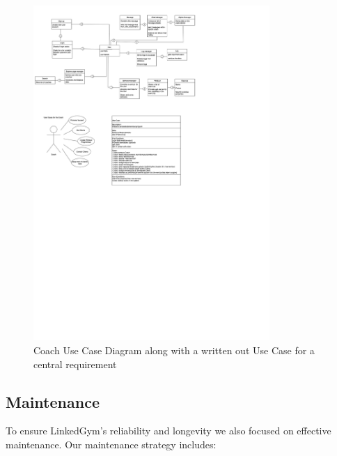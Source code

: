   \begin{figure}[H]
    \centering
    \includegraphics[width=0.8\textwidth]{images/usercase.png}
    \caption{ Coach Use Case Diagram along with a written out Use Case for a central requirement }
    \label{fig:usercase}
  \end{figure}




\subsection{Maintenance}
To ensure LinkedGym's reliability and longevity we also focused on effective maintenance. Our maintenance strategy includes:

